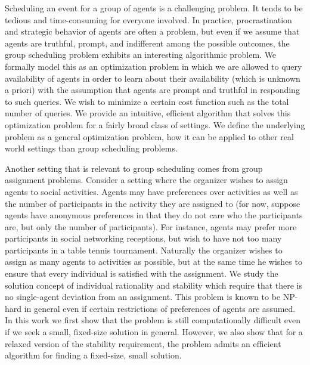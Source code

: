 \label{intro:chapter}


Scheduling an event for a group of agents is a challenging problem. 
It tends to be tedious and time-consuming for everyone involved.
In practice, procrastination and strategic behavior of agents are often a problem, but even if we assume that agents are truthful, prompt, and indifferent among the possible outcomes, the group scheduling problem exhibits an interesting algorithmic problem. 
We formally model this as an optimization problem in which we are allowed to query availability of agents in order to learn about their availability (which is unknown a priori) with the assumption that agents are prompt and truthful in responding to such queries. We wish to minimize a certain cost function such as the total number of queries. We provide an intuitive, efficient algorithm that solves this optimization problem for a fairly broad class of settings. We define the underlying problem as a general optimization problem, how it can be applied to other real world settings than group scheduling problems.

Another setting that is relevant to group scheduling comes from group assignment problems. Consider a setting where the organizer wishes to assign agents to social activities. Agents may have preferences over activities as well as the number of participants in the activity they are assigned to (for now, suppose agents have anonymous preferences in that they do not care who the participants are, but only the number of participants). For instance, agents may prefer more participants in social networking receptions, but wish to have not too many participants in a table tennis tournament. Naturally the organizer wishes to assign as many agents to activities as possible, but at the same time he wishes to ensure that every individual is satisfied with the assignment. We study the solution concept of individual rationality and stability which require that there is no single-agent deviation from an assignment. This problem is known to be NP-hard in general even if certain restrictions of preferences of agents are assumed. In this work we first show that the problem is still computationally difficult even if we seek a small, fixed-size solution in general. However, we also show that for a relaxed version of the stability requirement, the problem admits an efficient algorithm for finding a fixed-size, small solution. 

